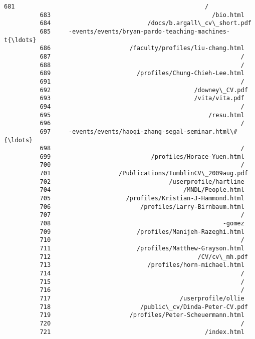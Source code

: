 \documentclass[11pt]{article}
\begin{document}
\begin{Verbatim}[commandchars=\\\{\}]
          681                                                     /
          683                                             /bio.html
          684                           /docs/b.argall\_cv\_short.pdf
          685     -events/events/bryan-pardo-teaching-machines-t{\ldots}
          686                      /faculty/profiles/liu-chang.html
          687                                                     /
          688                                                     /
          689                        /profiles/Chung-Chieh-Lee.html
          691                                                     /
          692                                        /downey\_CV.pdf
          693                                        /vita/vita.pdf
          694                                                     /
          695                                            /resu.html
          696                                                     /
          697     -events/events/haoqi-zhang-segal-seminar.html\#{\ldots}
          698                                                     /
          699                            /profiles/Horace-Yuen.html
          700                                                     /
          701                   /Publications/TumblinCV\_2009aug.pdf
          702                                 /userprofile/hartline
          704                                     /MNDL/People.html
          705                     /profiles/Kristian-J-Hammond.html
          706                         /profiles/Larry-Birnbaum.html
          707                                                     /
          708                                                -gomez
          709                        /profiles/Manijeh-Razeghi.html
          710                                                     /
          711                        /profiles/Matthew-Grayson.html
          712                                         /CV/cv\_mh.pdf
          713                           /profiles/horn-michael.html
          714                                                     /
          715                                                     /
          716                                                     /
          717                                    /userprofile/ollie
          718                         /public\_cv/Dinda-Peter-CV.pdf
          719                      /profiles/Peter-Scheuermann.html
          720                                                     /
          721                                           /index.html

\end{Verbatim}
\end{document}
